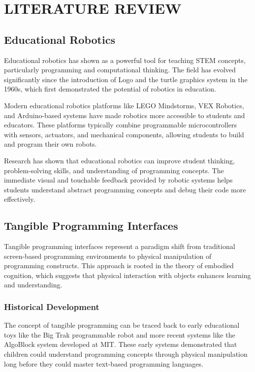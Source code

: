 \chapter{LITERATURE REVIEW}

\section{Educational Robotics}

Educational robotics has shown as a powerful tool for teaching STEM concepts, particularly programming and computational thinking. The field has evolved significantly since the introduction of Logo and the turtle graphics system in the 1960s, which first demonstrated the potential of robotics in education.

Modern educational robotics platforms like LEGO Mindstorms, VEX Robotics, and Arduino-based systems have made robotics more accessible to students and educators. These platforms typically combine programmable microcontrollers with sensors, actuators, and mechanical components, allowing students to build and program their own robots.

Research has shown that educational robotics can improve student thinking, problem-solving skills, and understanding of programming concepts. The immediate visual and touchable feedback provided by robotic systems helps students understand abstract programming concepts and debug their code more effectively.

\section{Tangible Programming Interfaces}

Tangible programming interfaces represent a paradigm shift from traditional screen-based programming environments to physical manipulation of programming constructs. This approach is rooted in the theory of embodied cognition, which suggests that physical interaction with objects enhances learning and understanding.

\subsection{Historical Development}

The concept of tangible programming can be traced back to early educational toys like the Big Trak programmable robot and more recent systems like the AlgoBlock system developed at MIT. These early systems demonstrated that children could understand programming concepts through physical manipulation long before they could master text-based programming languages.

